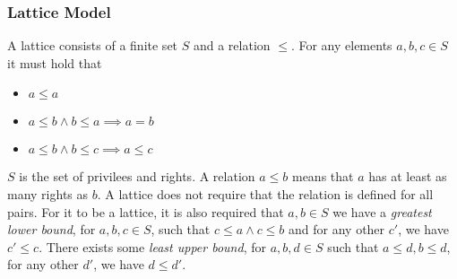     \begin{frame}
        \frametitle{Lattice Model}
            A lattice consists of a finite set $S$ and a relation $\leq$. For any elements $a, b, c \in S$ it must hold that
            \begin{itemize}
                \item $a \leq a$
                \item $a \leq b \land b \leq a \implies a = b$
                \item $a \leq b \land b \leq c \implies a \leq c$ 
            \end{itemize}
            $S$ is the set of privilees and rights. A relation $a \leq b$ means that $a$ has at least as many rights as $b$. A lattice does not require that the relation is defined for all pairs. 
            For it to be a lattice, it is also required that $a, b \in S$ we have a \textit{greatest lower bound}, for $a, b, c \in S$, such that $c \leq a \land c \leq b$ and for any other $c'$, we have $c' \leq c$. 
            There exists some \textit{least upper bound}, for $a, b, d \in S$ such that $a \leq d, b \leq d$, for any other $d'$, we have $d \leq d'$. 
    \end{frame}

